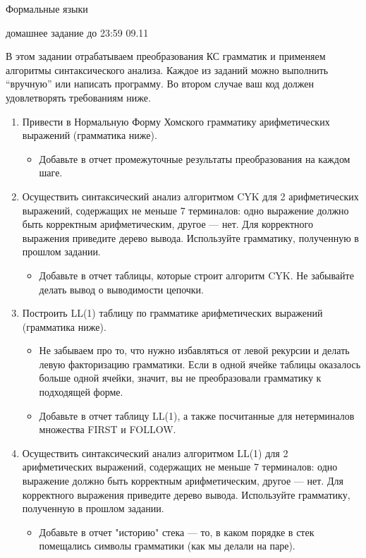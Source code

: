 \documentclass[12pt]{article}
\begin{document}
\begin{center}
{\LARGE Формальные языки}


{\Large домашнее задание до 23:59 09.11}
\end{center}

\bigskip

В этом задании отрабатываем преобразования КС грамматик и применяем алгоритмы синтаксического анализа. Каждое из заданий можно выполнить ``вручную'' или написать программу. Во втором случае ваш код должен удовлетворять требованиям ниже. 

\begin{enumerate}
  \item 
  {
    Привести в Нормальную Форму Хомского грамматику арифметических выражений (грамматика ниже).
    \begin{itemize}
      \item Добавьте в отчет промежуточные результаты преобразования на каждом шаге. 
    \end{itemize}
  }
  \item 
  {  
    Осуществить синтаксический анализ алгоритмом CYK для 2 арифметических выражений, содержащих не меньше 7 терминалов: одно выражение должно быть корректным арифметическим, другое --- нет. Для корректного выражения приведите дерево вывода. Используйте грамматику, полученную в прошлом задании.
    \begin{itemize}
      \item Добавьте в отчет таблицы, которые строит алгоритм CYK. Не забывайте делать вывод о выводимости цепочки. 
    \end{itemize}
  }
  \item 
  { 
    Построить LL(1) таблицу по грамматике арифметических выражений (грамматика ниже). 
    \begin{itemize}
      \item Не забываем про то, что нужно избавляться от левой рекурсии и делать левую факторизацию грамматики. Если в одной ячейке таблицы оказалось больше одной ячейки, значит, вы не преобразовали грамматику к подходящей форме.
      \item Добавьте в отчет таблицу LL(1), а также посчитанные для нетерминалов множества FIRST и FOLLOW. 
    \end{itemize}
  }
  \item
  {
    Осуществить синтаксический анализ алгоритмом LL(1) для 2 арифметических выражений, содержащих не меньше 7 терминалов: одно выражение должно быть корректным арифметическим, другое --- нет. Для корректного выражения приведите дерево вывода. Используйте грамматику, полученную в прошлом задании. 
    \begin{itemize}
      \item Добавьте в отчет "историю" стека --- то, в каком порядке в стек помещались символы грамматики (как мы делали на паре). 
    \end{itemize}
  }
\end{enumerate}
\end{document}
